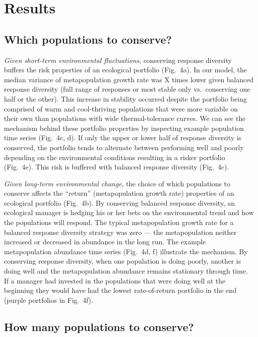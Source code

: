 \section{Results}

\subsection{Which populations to conserve?}

\emph{Given short-term environmental fluctuations}, conserving response diversity buffers the risk properties of an ecological portfolio (Fig.~4a). In our model, the median variance of metapopulation growth rate was X times lower given balanced response diversity (full range of responses or most stable only vs.~conserving one half or the other). This increase in stability occurred despite the portfolio being comprised of warm and cool-thriving populations that were more variable on their own than populations with wide thermal-tolerance curves. We can see the mechanism behind these portfolio properties by inspecting example population time series (Fig.~4c, d). If only the upper or lower half of response diversity is conserved, the portfolio tends to alternate between performing well and poorly depending on the environmental conditions resulting in a risker portfolio (Fig.~4e). This risk is buffered with balanced response diversity (Fig.~4c).

\emph{Given long-term environmental change}, the choice of which populations to conserve affects the ``return'' (metapopulation growth rate) properties of an ecological portfolio (Fig.~4b). By conserving balanced response diversity, an ecological manager is hedging his or her bets on the environmental trend and how the populations will respond. The typical metapopulation growth rate for a balanced response diversity strategy was zero --- the metapopulation neither increased or decreased in abundance in the long run. The example metapopulation abundance time series (Fig.~4d, f) illustrate the mechanism. By conserving response diversity, when one population is doing poorly, another is doing well and the metapopulation abundance remains stationary through time. If a manager had invested in the populations that were doing well at the beginning they would have had the lowest rate-of-return portfolio in the end (purple portfolios in Fig.~4f).

\subsection{How many populations to conserve?}

